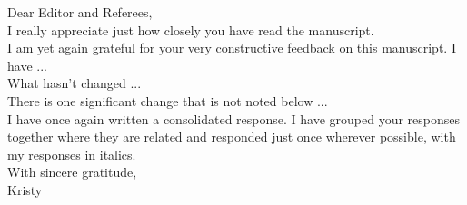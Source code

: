 \documentclass[12pt]{article}
\begin{document}
Dear Editor and Referees, \\

I really appreciate just how closely you have read the manuscript. \\

I am yet again grateful for your very constructive feedback on this manuscript. I have ... \\

What hasn't changed ...  \\

There is one significant change that is not noted below ... \\

I have once again written a consolidated response. I have grouped your responses together where they are related and responded just once wherever possible, with my responses in italics. \\

With sincere gratitude,\\
Kristy
\end{document}
